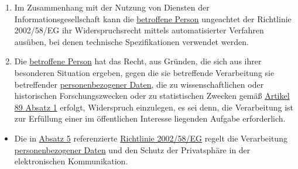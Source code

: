 \begin{enumerate}
  \item Im Zusammenhang mit der Nutzung von Diensten der Informationsgesellschaft kann die \hyperref[itm:04-1]{betroffene Person} ungeachtet
   der Richtlinie 2002/58/EG ihr Widerspruchsrecht mittels automatisierter Verfahren ausüben, bei denen technische
   Spezifikationen verwendet werden.
  \label{itm:21-5}

  \item Die \hyperref[itm:04-1]{betroffene Person} hat das Recht, aus Gründen, die sich aus ihrer besonderen Situation ergeben, gegen die sie
   betreffende Verarbeitung sie betreffender \hyperref[itm:04-1]{personenbezogener Daten}, die zu wissenschaftlichen oder historischen
   Forschungszwecken oder zu statistischen Zwecken gemäß \hyperref[itm:89-1]{Artikel 89 Absatz 1} erfolgt, Widerspruch
   einzulegen, es sei denn, die Verarbeitung ist zur Erfüllung einer im öffentlichen Interesse liegenden Aufgabe
   erforderlich.
  \label{itm:21-6}

\end{enumerate}


\begin{itemize}

  \item Die in \hyperref[itm:21-5]{Absatz 5} referenzierte
   \href{https://eur-lex.europa.eu/legal-content/DE/TXT/HTML/?uri=CELEX:32002L0058&qid=1659212895940&from=DE}
    {Richtlinie 2002/58/EG} regelt die Verarbeitung \hyperref[itm:04-1]{personenbezogener Daten} und den Schutz der Privatsphäre in der
    elektronischen Kommunikation.

\end{itemize}




